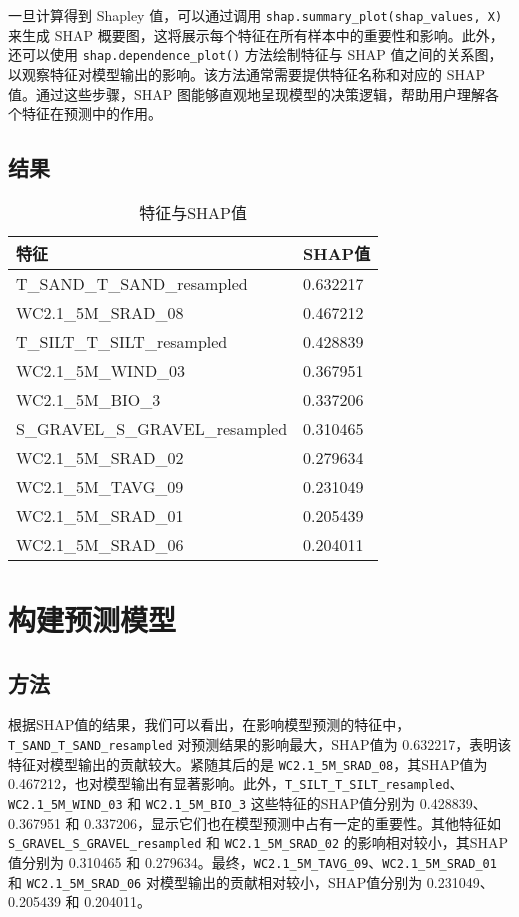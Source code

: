 \documentclass[AutoFakeBold]{LZUThesis-PgD&PhD}
\begin{document}
一旦计算得到 Shapley 值，可以通过调用 \texttt{shap.summary\_plot(shap\_values, X)} 来生成 SHAP 概要图，这将展示每个特征在所有样本中的重要性和影响。此外，还可以使用 \texttt{shap.dependence\_plot()} 方法绘制特征与 SHAP 值之间的关系图，以观察特征对模型输出的影响。该方法通常需要提供特征名称和对应的 SHAP 值。通过这些步骤，SHAP 图能够直观地呈现模型的决策逻辑，帮助用户理解各个特征在预测中的作用。
\subsection{结果}

\begin{table}[H]
	\centering
	\begin{tabular}{|l|l|}
		\hline
		\textbf{特征}                         & \textbf{SHAP值} \\ \hline
		T\_SAND\_T\_SAND\_resampled            & 0.632217        \\ \hline
		WC2.1\_5M\_SRAD\_08                   & 0.467212        \\ \hline
		T\_SILT\_T\_SILT\_resampled            & 0.428839        \\ \hline
		WC2.1\_5M\_WIND\_03                   & 0.367951        \\ \hline
		WC2.1\_5M\_BIO\_3                      & 0.337206        \\ \hline
		S\_GRAVEL\_S\_GRAVEL\_resampled       & 0.310465        \\ \hline
		WC2.1\_5M\_SRAD\_02                   & 0.279634        \\ \hline
		WC2.1\_5M\_TAVG\_09                   & 0.231049        \\ \hline
		WC2.1\_5M\_SRAD\_01                   & 0.205439        \\ \hline
		WC2.1\_5M\_SRAD\_06                   & 0.204011        \\ \hline
	\end{tabular}
	\caption{特征与SHAP值}
	\label{tab:shap_values}
\end{table}



\section{构建预测模型}


\subsection{方法}
根据SHAP值的结果，我们可以看出，在影响模型预测的特征中，\texttt{\break T\_SAND\_T\_SAND\_resampled} 对预测结果的影响最大，SHAP值为 0.632217，表明该特征对模型输出的贡献较大。紧随其后的是 \texttt{WC2.1\_5M\_SRAD\_08}，其SHAP值为 0.467212，也对模型输出有显著影响。此外，\texttt{T\_SILT\_T\_SILT\_resampled}、\texttt{WC2.1\_5M\_WIND\_03} 和 \texttt{WC2.1\_5M\_BIO\_3} 这些特征的SHAP值分别为 0.428839、0.367951 和 0.337206，显示它们也在模型预测中占有一定的重要性。其他特征如 \texttt{S\_GRAVEL\_S\_GRAVEL\_resampled} 和 \texttt{WC2.1\_5M\_SRAD\_02} 的影响相对较小，其SHAP值分别为 0.310465 和 0.279634。最终，\texttt{WC2.1\_5M\_TAVG\_09}、\texttt{WC2.1\_5M\_SRAD\_01} 和 \texttt{WC2.1\_5M\_SRAD\_06} 对模型输出的贡献相对较小，SHAP值分别为 0.231049、0.205439 和 0.204011。
\end{document}
